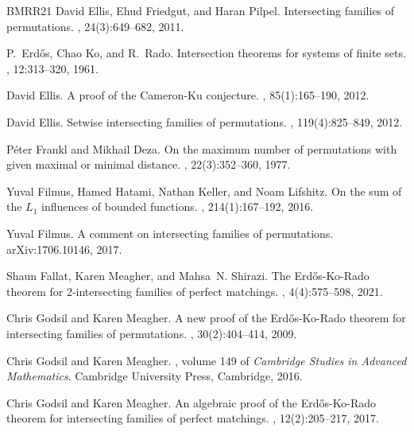 \documentclass[10pt,a4paper]{article}
\theoremstyle{definition}
\begin{document}
\begin{thebibliography}{BMRR21}
David Ellis, Ehud Friedgut, and Haran Pilpel.
\newblock Intersecting families of permutations.
, 24(3):649--682, 2011.

P.~Erd\H{o}s, Chao Ko, and R.~Rado.
\newblock Intersection theorems for systems of finite sets.
, 12:313--320, 1961.

David Ellis.
\newblock A proof of the {C}ameron-{K}u conjecture.
, 85(1):165--190, 2012.

David Ellis.
\newblock Setwise intersecting families of permutations.
, 119(4):825--849, 2012.

P\'{e}ter Frankl and Mikhail Deza.
\newblock On the maximum number of permutations with given maximal or minimal
  distance.
, 22(3):352--360, 1977.

Yuval Filmus, Hamed Hatami, Nathan Keller, and Noam Lifshitz.
\newblock On the sum of the {$L_1$} influences of bounded functions.
, 214(1):167--192, 2016.

Yuval Filmus.
\newblock A comment on intersecting families of permutations.
\newblock arXiv:1706.10146, 2017.

Shaun Fallat, Karen Meagher, and Mahsa~N. Shirazi.
\newblock The {E}rd{\H{o}}s-{K}o-{R}ado theorem for 2-intersecting families of
  perfect matchings.
, 4(4):575--598, 2021.

Chris Godsil and Karen Meagher.
\newblock A new proof of the {E}rd{\H{o}}s-{K}o-{R}ado theorem for intersecting
  families of permutations.
, 30(2):404--414, 2009.

Chris Godsil and Karen Meagher.
, volume
  149 of {\em Cambridge Studies in Advanced Mathematics}.
\newblock Cambridge University Press, Cambridge, 2016.

Chris Godsil and Karen Meagher.
\newblock An algebraic proof of the {E}rd{\H{o}}s-{K}o-{R}ado theorem for
  intersecting families of perfect matchings.
, 12(2):205--217, 2017.


\end{thebibliography}
\end{document}
